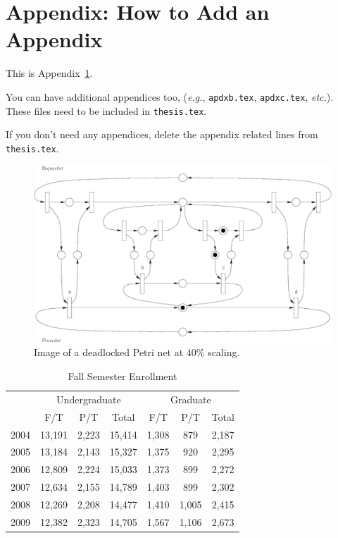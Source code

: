 
\chapter{Appendix: How to Add an Appendix}
\label{apdx:a}

This is Appendix~\ref{apdx:a}.

You can have additional appendices too, (\emph{e.g.}, \texttt{apdxb.tex},
\texttt{apdxc.tex}, \emph{etc.}). These files need to be included in
\texttt{thesis.tex}.

If you don't need any appendices, delete the appendix
related lines from \texttt{thesis.tex}.

\begin{figure}
\centering
\includegraphics[scale=0.40]{Images/db-deadlock}
\caption{\label{fig:app-db-deadlock} Image of a deadlocked Petri net at 40\%
  scaling.} 
\end{figure}

\begin{table}[!htbp]
\centering
\caption{Fall Semester Enrollment}
\label{tab:app-pop}
\vspace{2mm}
\begin{tabular}{c||c|c|c||c|c|c|}
\hline
	& \multicolumn{3}{c||}{Undergraduate}
	& \multicolumn{3}{c|}{Graduate} \\
\cline{2-7}
     & F/T & P/T & Total & F/T & P/T & Total \\
\cline{2-7}
2004 & 13,191 & 2,223 & 15,414 & 1,308 & 879 & 2,187 \\
2005 & 13,184 & 2,143 & 15,327 & 1,375 & 920 & 2,295 \\
2006 & 12,809 & 2,224 & 15,033 & 1,373 & 899 & 2,272 \\
2007 & 12,634 & 2,155 & 14,789 & 1,403 & 899 & 2,302 \\
2008 & 12,269 & 2,208 & 14,477 & 1,410 &1,005& 2,415 \\
2009 & 12,382 & 2,323 & 14,705 & 1,567 &1,106& 2,673 \\
\hline
\end{tabular}
\end{table}
